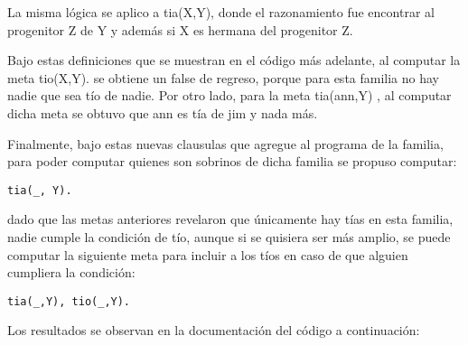 \documentclass[11pt, letterpaper]{article}
\begin{document}
La misma lógica se aplico a tia(X,Y), donde  el razonamiento fue encontrar al progenitor Z de Y y además si X es hermana del progenitor Z.

Bajo estas definiciones que se muestran en el código más adelante, al computar la meta tio(X,Y). se obtiene un false de regreso, porque para esta familia no hay nadie que sea tío de nadie.
Por otro lado, para la meta tia(ann,Y) , al computar dicha meta se obtuvo que ann es tía de jim y nada más.

Finalmente, bajo estas nuevas clausulas que agregue al programa de la familia, para poder computar quienes son sobrinos de dicha familia se propuso computar:
\begin{lstlisting}
tia(_, Y).
\end{lstlisting} dado que las metas anteriores revelaron que únicamente hay tías en esta familia, nadie cumple la condición de tío, aunque si se quisiera ser más amplio, se puede computar la siguiente meta para incluir a los tíos en caso de que alguien cumpliera la condición:

\begin{lstlisting}
tia(_,Y), tio(_,Y).
\end{lstlisting}

Los resultados se observan en la documentación del código a continuación:
\end{document}
